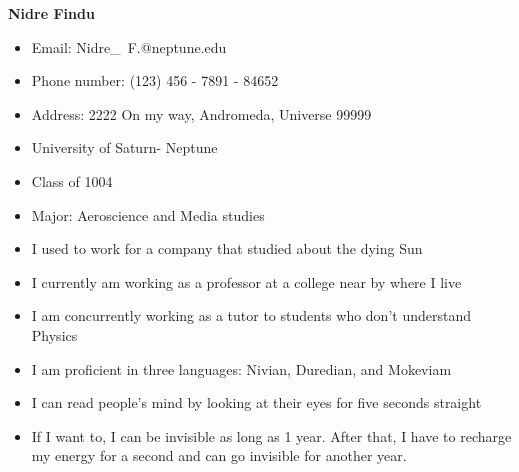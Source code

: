 \documentclass[12pt]{article}
\begin{document}
\centerline{\bf{Nidre Findu}}
\vspace{7mm}

\begin{itemize}
    \vspace{1mm}
    \item Email: Nidre\_\ F.@neptune.edu\\
    \vspace{-3.5mm}
    \item Phone number: (123) 456 - 7891 - 84652\\
    \vspace{-3.5mm}
    \item Address: 2222 On my way, Andromeda, Universe 99999
\end{itemize}

\vspace{2mm}

\begin{itemize}
\vspace{1mm}
\item University of Saturn- Neptune\\ 
\vspace{-3.5mm}
\item Class of 1004\\
\vspace{-3.5mm}
\item Major: Aeroscience and Media studies
\end{itemize}


\begin{itemize}
\vspace{1mm}
\item I used to work for a company that studied about the dying Sun\\ 
\vspace{-3.5mm}
\item I currently am working as a professor at a college near by where I live\\
\vspace{-3.5mm}
\item I am concurrently working as a tutor to students who don't understand Physics 
\end{itemize}


\begin{itemize}
\vspace{1mm}
\item I am proficient in three languages: Nivian, Duredian, and Mokeviam\\ 
\vspace{-3.5mm}
\item I can read people's mind by looking at their eyes for five seconds straight\\
\vspace{-3.5mm}
\item If I want to, I can be invisible as long as 1 year. After that, I have to recharge my energy for a second and can go invisible for another year. 
\end{itemize}
\end{document}
